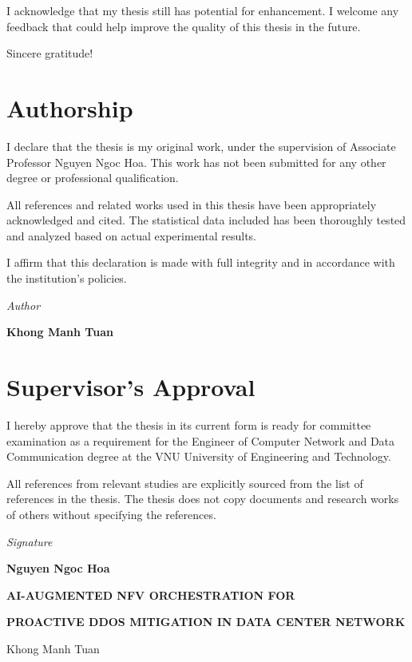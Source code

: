 \documentclass[12pt, a4paper, reqno, oneside]{book}
\begin{document}
I acknowledge that my thesis still has potential for enhancement. I welcome any feedback that could help improve the quality of this thesis in the future.

Sincere gratitude!


\newpage
\chapter*{Authorship}
\vspace{20pt}

I declare that the thesis is my original work, under the supervision of Associate Professor Nguyen Ngoc Hoa. This work has not been submitted for any other degree or professional qualification.

All references and related works used in this thesis have been appropriately acknowledged and cited. The statistical data included has been thoroughly tested and analyzed based on actual experimental results. 

I affirm that this declaration is made with full integrity and in accordance with the institution's policies.

\begin{flushright}
{\it Author}
\hskip 1.5cm\quad


\vskip 2cm
{\bf Khong Manh Tuan }  \quad\ 
\end{flushright}
\newpage



\newpage
\chapter*{Supervisor's Approval}
\vspace{20pt}
I hereby approve that the thesis in its current form is ready for committee examination as a requirement for the Engineer of Computer Network and Data Communication degree at the VNU University of Engineering and Technology.

All references from relevant studies are explicitly sourced from the list of references in the thesis. The thesis does not copy documents and research works of others without specifying the references.


\begin{flushright}
{\it Signature}
\hskip 1.5cm\quad

\vskip 2cm
{\bf Nguyen Ngoc Hoa }  \quad\ 
\end{flushright}


\newpage
\centerline{\bf AI-AUGMENTED NFV ORCHESTRATION FOR }
\centerline{\bf PROACTIVE DDOS MITIGATION IN DATA CENTER NETWORK}
\vspace{10pt}
\centerline{Khong Manh Tuan}
\end{document}
